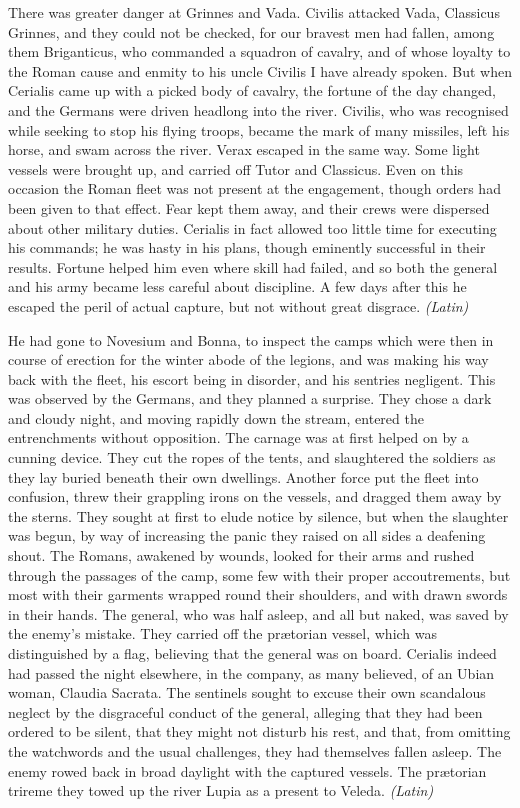 
There was greater danger at Grinnes and Vada. Civilis attacked Vada, Classicus Grinnes, and they could not be checked, for our bravest men had fallen, among them Briganticus, who commanded a squadron of cavalry, and of whose loyalty to the Roman cause and enmity to his uncle Civilis I have already spoken. But when Cerialis came up with a picked body of cavalry, the fortune of the day changed, and the Germans were driven headlong into the river. Civilis, who was recognised while seeking to stop his flying troops, became the mark of many missiles, left his horse, and swam across the river. Verax escaped in the same way. Some light vessels were brought up, and carried off Tutor and Classicus. Even on this occasion the Roman fleet was not present at the engagement, though orders had been given to that effect. Fear kept them away, and their crews were dispersed about other military duties. Cerialis in fact allowed too little time for executing his commands; he was hasty in his plans, though eminently successful in their results. Fortune helped him even where skill had failed, and so both the general and his army became less careful about discipline. A few days after this he escaped the peril of actual capture, but not without great disgrace. \emph{(Latin)}


He had gone to Novesium and Bonna, to inspect the camps which were then in course of erection for the winter abode of the legions, and was making his way back with the fleet, his escort being in disorder, and his sentries negligent. This was observed by the Germans, and they planned a surprise. They chose a dark and cloudy night, and moving rapidly down the stream, entered the entrenchments without opposition. The carnage was at first helped on by a cunning device. They cut the ropes of the tents, and slaughtered the soldiers as they lay buried beneath their own dwellings. Another force put the fleet into confusion, threw their grappling irons on the vessels, and dragged them away by the sterns. They sought at first to elude notice by silence, but when the slaughter was begun, by way of increasing the panic they raised on all sides a deafening shout. The Romans, awakened by wounds, looked for their arms and rushed through the passages of the camp, some few with their proper accoutrements, but most with their garments wrapped round their shoulders, and with drawn swords in their hands. The general, who was half asleep, and all but naked, was saved by the enemy's mistake. They carried off the prætorian vessel, which was distinguished by a flag, believing that the general was on board. Cerialis indeed had passed the night elsewhere, in the company, as many believed, of an Ubian woman, Claudia Sacrata. The sentinels sought to excuse their own scandalous neglect by the disgraceful conduct of the general, alleging that they had been ordered to be silent, that they might not disturb his rest, and that, from omitting the watchwords and the usual challenges, they had themselves fallen asleep. The enemy rowed back in broad daylight with the captured vessels. The prætorian trireme they towed up the river Lupia as a present to Veleda. \emph{(Latin)}

